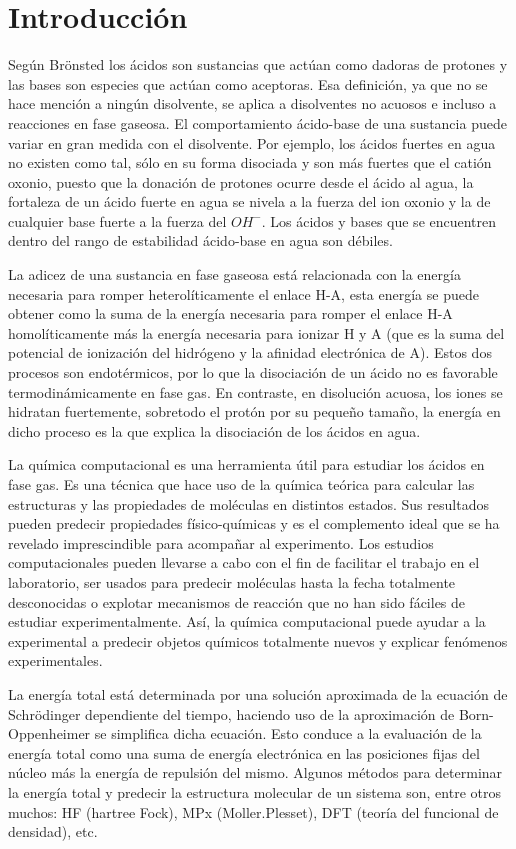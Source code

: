 \chapter{Introducción}
Según Brönsted los ácidos son sustancias que actúan como dadoras de protones y las bases son especies que actúan como aceptoras. Esa definición, ya que no se hace mención a ningún disolvente, se aplica a disolventes no acuosos e incluso a reacciones en fase gaseosa. El comportamiento ácido-base de una sustancia puede variar en gran medida con el disolvente. Por ejemplo, los ácidos fuertes en agua no existen como tal, sólo en su forma disociada y son más fuertes que el catión oxonio, puesto que la donación de protones ocurre desde el ácido al agua, la fortaleza de un ácido fuerte en agua se nivela a la fuerza del ion oxonio y la de cualquier base fuerte a la fuerza del $OH ^-$. Los ácidos y bases que se encuentren dentro del rango de estabilidad ácido-base en agua son débiles. \cite {quimica1}

La adicez de una sustancia en fase gaseosa está relacionada con la energía necesaria para romper heterolíticamente el enlace H-A, esta energía se puede obtener como la suma de la energía necesaria para romper el enlace H-A homolíticamente más la energía necesaria para ionizar H y A (que es la suma del potencial de ionización del hidrógeno y la afinidad electrónica de A). Estos dos procesos son endotérmicos, por lo que la disociación de un ácido no es favorable termodinámicamente en fase gas. En contraste, en disolución acuosa, los iones se hidratan fuertemente, sobretodo el protón por su pequeño tamaño, la energía en dicho proceso es la que explica la disociación de los ácidos en agua.

La química computacional es una herramienta útil para estudiar los ácidos en fase gas. Es una técnica que hace uso de la química teórica para calcular las estructuras y las propiedades de moléculas en distintos estados. Sus resultados pueden predecir propiedades físico-químicas y es el complemento ideal que se ha revelado imprescindible para acompañar al experimento. Los estudios computacionales pueden llevarse a cabo con el fin de facilitar el trabajo en el laboratorio, ser usados para predecir moléculas hasta la fecha totalmente desconocidas o explotar mecanismos de reacción que no han sido fáciles de estudiar experimentalmente. Así, la química computacional puede ayudar a la experimental a predecir objetos químicos totalmente nuevos y explicar fenómenos experimentales.

La energía total está determinada por una solución aproximada de la ecuación de Schrödinger dependiente del tiempo, haciendo uso de la aproximación de Born-Oppenheimer se simplifica dicha ecuación. Esto conduce a la evaluación de la energía total como una suma de energía electrónica en las posiciones fijas del núcleo más la energía de repulsión del mismo. Algunos métodos para determinar la energía total y predecir la estructura molecular de un sistema son, entre otros muchos: HF (hartree Fock), MPx (Moller.Plesset), DFT (teoría del funcional de densidad), etc. \cite {quimica2}

